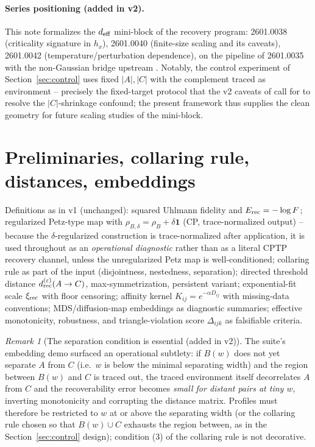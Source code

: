 \documentclass[11pt]{article}
\theoremstyle{remark}
\newtheorem{remark}[definition]{Remark}
\begin{document}
\paragraph{Series positioning (added in v2).} This note formalizes the
$d_{\rm eff}$ mini-block of the recovery program: 2601.0038
\cite{S0038} (criticality signature in $h_x$), 2601.0040 \cite{S0040}
(finite-size scaling and its caveats), 2601.0042 \cite{S0042}
(temperature/perturbation dependence), on the pipeline of 2601.0035
\cite{S0035} with the non-Gaussian bridge upstream \cite{S0101}.
Notably, the control experiment of Section~\ref{sec:control} uses fixed
$|A|, |C|$ with the complement traced as environment -- precisely the
fixed-target protocol that the v2 caveats of \cite{S0038, S0040, S0042}
call for to resolve the $|C|$-shrinkage confound; the present framework
thus supplies the clean geometry for future scaling studies of the
mini-block.

\section{Preliminaries, collaring rule, distances, embeddings}
Definitions as in v1 (unchanged): squared Uhlmann fidelity and
$E_{\rm rec} = -\log F$; regularized Petz-type map with
$\rho_{B,\delta} = \rho_B + \delta\mathbf{1}$ (CP, trace-normalized
output) -- because the $\delta$-regularized construction is
trace-normalized after application, it is used throughout as an
\emph{operational diagnostic} rather than as a literal CPTP recovery
channel, unless the unregularized Petz map is well-conditioned; collaring rule as part of the input (disjointness, nestedness,
separation); directed threshold distance $d^{(\varepsilon)}_{\rm rec}
(A \to C)$, max-symmetrization, persistent variant; exponential-fit scale
$\xi_{\rm rec}$ with floor censoring; affinity kernel $K_{ij} =
e^{-\alpha D_{ij}}$ with missing-data conventions; MDS/diffusion-map
embeddings as diagnostic summaries; effective monotonicity, robustness,
and triangle-violation score $\Delta_{ijk}$ as falsifiable criteria.

\begin{remark}[The separation condition is essential (added in v2)]
\label{rem:sep}
The suite's embedding demo surfaced an operational subtlety: if $B(w)$
does not yet separate $A$ from $C$ (i.e.\ $w$ is below the minimal
separating width) and the region between $B(w)$ and $C$ is traced out,
the traced environment itself decorrelates $A$ from $C$ and the
recoverability error becomes \emph{small for distant pairs at tiny $w$},
inverting monotonicity and corrupting the distance matrix. Profiles must
therefore be restricted to $w$ at or above the separating width (or the
collaring rule chosen so that $B(w) \cup C$ exhausts the region between,
as in the Section~\ref{sec:control} design); condition (3) of the
collaring rule is not decorative.
\end{remark}
\end{document}
